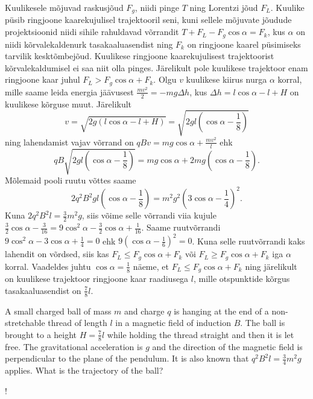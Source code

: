 {\ifSolution
Kuulikesele mõjuvad raskusjõud $F_g$, niidi pinge $T$ ning Lorentzi jõud $F_L$. Kuulike püsib ringjoone kaarekujulisel trajektooril seni, kuni sellele mõjuvate jõudude projektsioonid niidi sihile rahuldavad võrrandit $T+F_L-F_g\cos\alpha=F_k$, kus $\alpha$ on niidi kõrvalekaldenurk tasakaaluasendist ning $F_k$ on ringjoone kaarel püsimiseks tarvilik kesktõmbejõud. Kuulikese ringjoone kaarekujulisest trajektoorist kõrvalekaldumisel ei saa niit olla pinges. Järelikult pole kuulikese trajektoor enam ringjoone kaar juhul $F_L>F_g\cos\alpha+F_k$. Olgu $v$ kuulikese kiirus nurga $\alpha$ korral, mille saame leida energia jäävusest $\frac{mv^2}{2}=-mg\Delta h$, kus $\Delta h=l\cos\alpha-l+H$ on kuulikese kõrguse muut. Järelikult 
\[
v=\sqrt{2g\left(l\cos\alpha-l+H\right)}=\sqrt{2gl\left(\cos\alpha-\frac{1}{8}\right)}
\]
ning lahendamist vajav võrrand on $qBv=mg\cos\alpha+\frac{mv^2}{l}$ ehk 
\[
qB\sqrt{2gl\left(\cos\alpha-\frac{1}{8}\right)}=mg\cos\alpha+2mg\left(\cos\alpha-\frac{1}{8}\right).
\]
Mõlemaid pooli ruutu võttes saame
\[
2q^2B^2gl\left(\cos\alpha-\frac{1}{8}\right)=m^2g^2\left(3\cos\alpha-\frac{1}{4}\right)^2.
\] 
Kuna $2q^2B^2l=\frac{3}{2}m^2g$, siis võime selle võrrandi viia kujule $\frac{3}{2}\cos\alpha-\frac{3}{16}=9\cos^2\alpha-\frac{3}{2}\cos\alpha+\frac{1}{16}$. Saame ruutvõrrandi $9\cos^2\alpha-3\cos\alpha+\frac{1}{4}=0$ ehk $9\left(\cos\alpha-\frac{1}{6}\right)^2=0$. Kuna selle ruutvõrrandi kaks lahendit on võrdsed, siis kas $F_L\leq F_g\cos\alpha+F_k$ või $F_L\geq F_g\cos\alpha+F_k$ iga $\alpha$ korral. Vaadeldes juhtu $\cos\alpha=\frac{1}{8}$ näeme, et $F_L\leq F_g\cos\alpha+F_k$ ning järelikult on kuulikese trajektoor ringjoone kaar raadiusega $l$, mille otspunktide kõrgus tasakaaluasendist on $\frac{7}{8}l$.
\fi


\ifEngStatement
A small charged ball of mass $m$ and charge $q$ is hanging at the end of a non-stretchable thread of length $l$ in a magnetic field of induction $B$. The ball is brought to a height $H=\frac{7}{8}l$ while holding the thread straight and then it is let free. The gravitational acceleration is $g$ and the direction of the magnetic field is perpendicular to the plane of the pendulum. It is also known that $q^2B^2l=\frac{3}{4}m^2g$ applies. What is the trajectory of the ball?
\begin{center}
\begin{resizebox}{0.5\linewidth}{!}{
}
\end{resizebox}
\end{center}}
